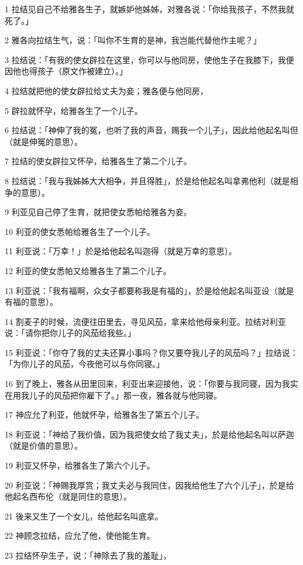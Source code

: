 \par 1 拉结见自己不给雅各生子，就嫉妒他姊姊，对雅各说：「你给我孩子，不然我就死了。」
\par 2 雅各向拉结生气，说：「叫你不生育的是神，我岂能代替他作主呢？」
\par 3 拉结说：「有我的使女辟拉在这里，你可以与他同房，使他生子在我膝下，我便因他也得孩子（原文作被建立）。」
\par 4 拉结就把他的使女辟拉给丈夫为妾；雅各便与他同房，
\par 5 辟拉就怀孕，给雅各生了一个儿子。
\par 6 拉结说：「神伸了我的冤，也听了我的声音，赐我一个儿子」，因此给他起名叫但（就是伸冤的意思）。
\par 7 拉结的使女辟拉又怀孕，给雅各生了第二个儿子。
\par 8 拉结说：「我与我姊姊大大相争，并且得胜」，於是给他起名叫拿弗他利（就是相争的意思）。
\par 9 利亚见自己停了生育，就把使女悉帕给雅各为妾。
\par 10 利亚的使女悉帕给雅各生了一个儿子。
\par 11 利亚说：「万幸！」於是给他起名叫迦得（就是万幸的意思）。
\par 12 利亚的使女悉帕又给雅各生了第二个儿子。
\par 13 利亚说：「我有福啊，众女子都要称我是有福的」，於是给他起名叫亚设（就是有福的意思）。
\par 14 割麦子的时候，流便往田里去，寻见风茄，拿来给他母亲利亚。拉结对利亚说：「请你把你儿子的风茄给我些。」
\par 15 利亚说：「你夺了我的丈夫还算小事吗？你又要夺我儿子的风茄吗？」拉结说：「为你儿子的风茄，今夜他可以与你同寝。」
\par 16 到了晚上，雅各从田里回来，利亚出来迎接他，说：「你要与我同寝，因为我实在用我儿子的风茄把你雇下了。」那一夜，雅各就与他同寝。
\par 17 神应允了利亚，他就怀孕，给雅各生了第五个儿子。
\par 18 利亚说：「神给了我价值，因为我把使女给了我丈夫」，於是给他起名叫以萨迦（就是价值的意思）。
\par 19 利亚又怀孕，给雅各生了第六个儿子。
\par 20 利亚说：「神赐我厚赏；我丈夫必与我同住，因我给他生了六个儿子」，於是给他起名西布伦（就是同住的意思）。
\par 21 後来又生了一个女儿，给他起名叫底拿。
\par 22 神顾念拉结，应允了他，使他能生育。
\par 23 拉结怀孕生子，说：「神除去了我的羞耻」，

